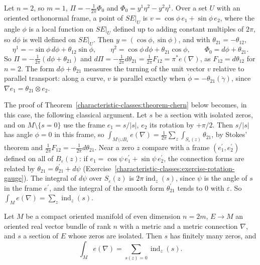 \begin{example}\label{characteristic-classes:example-chern-surfaces}
Let $n = 2$, so $m = 1$, $\Pi = -\frac{1}{2\pi}\Phi_0$ and $\Phi_0 = y^1\eta^2 - y^2\eta^1$. Over a set $U$ with an oriented orthonormal frame, a point of $SE|_U$ is
$v = \cos\phi\,e_1 + \sin\phi\,e_2$, where the angle $\phi$ is a local function on $SE|_U$ defined up to adding constant multiples of $2\pi$, so $d\phi$ is well defined on $SE|_U$.
Then $y = (\cos\phi, \sin\phi)$, and with $\theta_{21} = -\theta_{12}$,
\[
\eta^1 = -\sin\phi\,d\phi + \theta_{12}\sin\phi, \qquad \eta^2 = \cos\phi\,d\phi + \theta_{21}\cos\phi, \qquad \Phi_0 = d\phi + \theta_{21} .
\]
So $\Pi = -\frac{1}{2\pi}(d\phi + \theta_{21})$ and $d\Pi = -\frac{1}{2\pi}d\theta_{21} = \frac{1}{2\pi}F_{12} = \pi^*e(\nabla)$, as $F_{12} = d\theta_{12}$ for $n = 2$. The form $d\phi + \theta_{21}$
measures the turning of the unit vector $v$ relative to parallel transport: along a curve, $v$ is parallel exactly when $\dot\phi = -\theta_{21}(\dot\gamma)$, since
$\nabla e_1 = \theta_{21} \otimes e_2$.

The proof of Theorem~\ref{characteristic-classes:theorem-chern} below becomes, in this case, the following classical argument. Let $s$ be a section with isolated zeros, and on
$M \setminus \{s = 0\}$ use the frame $e_1 = s/|s|$, $e_2$ its rotation by $+\pi/2$. Then $s/|s|$ has angle $\phi = 0$ in this frame, so
$\int_{M \setminus \cup B_\varepsilon}e(\nabla) = \frac{1}{2\pi}\sum_z\int_{S_\varepsilon(z)}\theta_{21}$, by Stokes' theorem and $\frac{1}{2\pi}F_{12} = -\frac{1}{2\pi}d\theta_{21}$. Near a zero $z$ compare with a
frame $(e^{\prime}_1, e^{\prime}_2)$ defined on all of $B_\varepsilon(z)$: if $e_1 = \cos\psi\,e^{\prime}_1 + \sin\psi\,e^{\prime}_2$, the connection forms are related by $\theta_{21} = \theta^{\prime}_{21} + d\psi$
(Exercise~\ref{characteristic-classes:exercise-rotation-gauge}). The integral of $d\psi$ over $S_\varepsilon(z)$ is $2\pi\operatorname{ind}_z(s)$, since $\psi$ is the angle of $s$ in the frame
$e^{\prime}$, and the integral of the smooth form $\theta^{\prime}_{21}$ tends to $0$ with $\varepsilon$. So $\int_Me(\nabla) = \sum_z\operatorname{ind}_z(s)$.
\end{example}

\begin{theorem}[Chern]\label{characteristic-classes:theorem-chern}
Let $M$ be a compact oriented manifold of even dimension $n = 2m$, $E \to M$ an oriented real vector bundle of rank $n$ with a metric and a metric connection $\nabla$, and $s$ a section of
$E$ whose zeros are isolated. Then $s$ has finitely many zeros, and
\[
\int_Me(\nabla) = \sum_{s(z) = 0}\operatorname{ind}_z(s) .
\]
\end{theorem}

